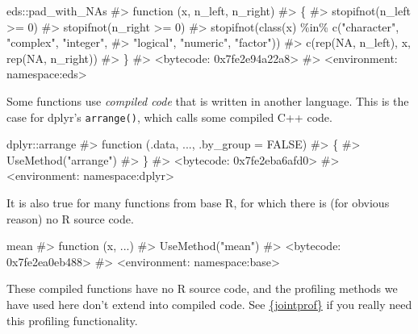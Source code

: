 \documentclass[
  letterpaper,
  DIV=11,
  numbers=noendperiod]{scrreprt}
\newenvironment{Shaded}{\begin{snugshade}}{\end{snugshade}}
\newcommand{\CommentTok}[1]{\textcolor[rgb]{0.37,0.37,0.37}{#1}}
\newcommand{\NormalTok}[1]{\textcolor[rgb]{0.00,0.23,0.31}{#1}}
\newcommand{\SpecialCharTok}[1]{\textcolor[rgb]{0.37,0.37,0.37}{#1}}
\begin{document}
\begin{Shaded}
\begin{Highlighting}[]
\NormalTok{eds}\SpecialCharTok{::}\NormalTok{pad\_with\_NAs}
\CommentTok{\#\textgreater{} function (x, n\_left, n\_right) }
\CommentTok{\#\textgreater{} \{}
\CommentTok{\#\textgreater{}     stopifnot(n\_left \textgreater{}= 0)}
\CommentTok{\#\textgreater{}     stopifnot(n\_right \textgreater{}= 0)}
\CommentTok{\#\textgreater{}     stopifnot(class(x) \%in\% c("character", "complex", "integer", }
\CommentTok{\#\textgreater{}         "logical", "numeric", "factor"))}
\CommentTok{\#\textgreater{}     c(rep(NA, n\_left), x, rep(NA, n\_right))}
\CommentTok{\#\textgreater{} \}}
\CommentTok{\#\textgreater{} \textless{}bytecode: 0x7fe2e94a22a8\textgreater{}}
\CommentTok{\#\textgreater{} \textless{}environment: namespace:eds\textgreater{}}
\end{Highlighting}
\end{Shaded}

Some functions use \emph{compiled code} that is written in another
language. This is the case for dplyr's \texttt{arrange()}, which calls
some compiled C++ code.

\begin{Shaded}
\begin{Highlighting}[]
\NormalTok{dplyr}\SpecialCharTok{::}\NormalTok{arrange}
\CommentTok{\#\textgreater{} function (.data, ..., .by\_group = FALSE) }
\CommentTok{\#\textgreater{} \{}
\CommentTok{\#\textgreater{}     UseMethod("arrange")}
\CommentTok{\#\textgreater{} \}}
\CommentTok{\#\textgreater{} \textless{}bytecode: 0x7fe2eba6afd0\textgreater{}}
\CommentTok{\#\textgreater{} \textless{}environment: namespace:dplyr\textgreater{}}
\end{Highlighting}
\end{Shaded}

It is also true for many functions from base R, for which there is (for
obvious reason) no R source code.

\begin{Shaded}
\begin{Highlighting}[]
\NormalTok{mean}
\CommentTok{\#\textgreater{} function (x, ...) }
\CommentTok{\#\textgreater{} UseMethod("mean")}
\CommentTok{\#\textgreater{} \textless{}bytecode: 0x7fe2ea0eb488\textgreater{}}
\CommentTok{\#\textgreater{} \textless{}environment: namespace:base\textgreater{}}
\end{Highlighting}
\end{Shaded}

These compiled functions have no R source code, and the profiling
methods we have used here don't extend into compiled code. See
\href{https://github.com/r-prof/jointprof}{\{jointprof\}} if you really
need this profiling functionality.
\end{document}

